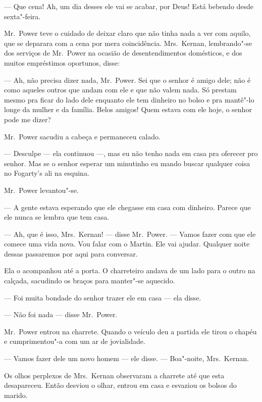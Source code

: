 --- Que cena!  Ah, um dia desses ele vai se acabar, por Deus!  Está bebendo
desde sexta"-feira.

Mr.~Power teve o cuidado de deixar claro que não tinha nada a ver com aquilo,
que se deparara com a cena por mera coincidência.  Mrs.~Kernan, lembrando"-se
dos serviços de Mr.~Power na ocasião de desentendimentos domésticos, e dos
muitos empréstimos oportunos, disse:

--- Ah, não precisa dizer nada, Mr.~Power.  Sei que o senhor é amigo dele; não
é como aqueles outros que andam com ele e que não valem nada.  Só prestam mesmo
pra ficar do lado dele enquanto ele tem dinheiro no bolso e pra mantê"-lo longe
da mulher e da família.  Belos amigos!  Quem estava com ele hoje, o senhor pode
me dizer?

Mr.~Power sacudiu a cabeça e permaneceu calado.

--- Desculpe --- ela continuou ---, mas eu não tenho nada em casa pra
oferecer pro senhor.  Mas se o senhor esperar um minutinho eu mando buscar
qualquer coisa no Fogarty’s ali na esquina.

Mr.~Power levantou"-se.

--- A gente estava esperando que ele chegasse em casa com dinheiro.  Parece que
ele nunca se lembra que tem casa.

--- Ah, que é isso, Mrs.~Kernan! --- disse Mr.~Power.  --- Vamos fazer com que
ele comece uma vida nova.  Vou falar com o Martin.  Ele vai ajudar.  Qualquer
noite dessas passaremos por aqui para conversar.

Ela o acompanhou até a porta.  O charreteiro andava de um lado para o outro na
calçada, sacudindo os braços para manter"-se aquecido.

--- Foi muita bondade do senhor trazer ele em casa --- ela disse.

--- Não foi nada --- disse Mr.~Power.

Mr.~Power entrou na charrete.  Quando o veículo deu a partida ele tirou o
chapéu e cumprimentou"-a com um ar de jovialidade.

--- Vamos fazer dele um novo homem --- ele disse.  --- Boa"-noite, Mrs.~Kernan.

\smallskip

\noindent\dotfill

\smallskip

Os olhos perplexos de Mrs.~Kernan observaram a charrete até que esta
desapareceu.  Então desviou o olhar, entrou em casa e esvaziou os bolsos do
marido.

